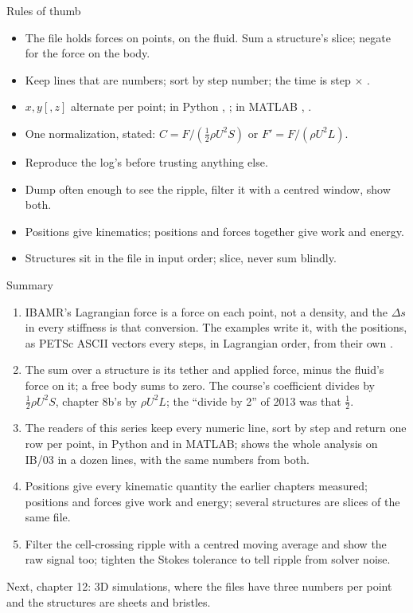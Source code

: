 \documentclass[aspectratio=169,11pt]{beamer}
\begin{document}
\begin{frame}{Rules of thumb}
\label{fr:thumb}
\small
\begin{itemize}
  \item The file holds forces on points, on the fluid. Sum a structure's slice; negate for the force on the body.
  \item Keep lines that are numbers; sort by step number; the time is step $\times$ .
  \item $x, y[, z]$ alternate per point; in Python \code{[:, 0]}, \code{[:, 1]}; in MATLAB , .
  \item One normalization, stated: $C = F/(\frac12\rho U^2 S)$ or $F' = F/(\rho U^2 L)$.
  \item Reproduce the log's  before trusting anything else.
  \item Dump often enough to see the ripple, filter it with a centred window, show both.
  \item Positions give kinematics; positions and forces together give work and energy.
  \item Structures sit in the file in input order; slice, never sum blindly.
\end{itemize}
\end{frame}

\begin{frame}{Summary}
\label{fr:summary}
\footnotesize
\begin{enumerate}
  \item IBAMR's Lagrangian force is a force on each point, not a density, and the $\Delta s$ in every stiffness is that conversion. The examples write it, with the positions, as PETSc ASCII vectors every  steps, in Lagrangian order, from their own .
  \item The sum over a structure is its tether and applied force, minus the fluid's force on it; a free body sums to zero. The course's coefficient divides by $\frac12\rho U^2 S$, chapter 8b's by $\rho U^2 L$; the ``divide by 2'' of 2013 was that $\frac12$.
  \item The readers of this series keep every numeric line, sort by step and return one row per point, in Python and in MATLAB;  shows the whole analysis on IB/03 in a dozen lines, with the same numbers from both.
  \item Positions give every kinematic quantity the earlier chapters measured; positions and forces give work and energy; several structures are slices of the same file.
  \item Filter the cell-crossing ripple with a centred moving average and show the raw signal too; tighten the Stokes tolerance to tell ripple from solver noise.
\end{enumerate}
\begin{homebox}
\footnotesize Next, chapter 12: 3D simulations, where the files have three numbers per point and the structures are sheets and bristles.
\end{homebox}
\end{frame}
\end{document}
